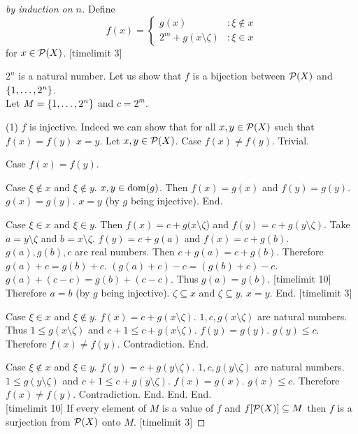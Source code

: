 \documentclass{article}
\begin{document}
\begin{forthel}
\begin{proof}[by induction on $n$]
  Define $$f(x) = \begin{cases} 
      g(x)                           & : \xi \notin x \\
      2^{m} + g(x \setminus \zeta)   & : \xi \in x  \end{cases}$$
  for $x \in {\cal P}(X)$. [timelimit 3]

  $2^{n}$ is a natural number.
  Let us show that $f$ is a bijection between ${\cal P}(X)$ and $\{1,\dots,2^{n}\}$.\\

    Let $M=\{1,\dots,2^{n}\}$ and $c = 2^{m}$.

    (1) $f$ is injective.
    Indeed we can show that for all $x,y \in {\cal P}(X)$ such that $f(x) = f(y)$ $x = y$.
      Let  $x,y \in {\cal P}(X)$.
      Case $f(x) \neq f(y)$. Trivial.
      
      Case $f(x) = f(y)$.

        Case $\xi \notin x$ and $\xi \notin y$. $x,y \in \operatorname{dom}(g)$. Then  $f(x) = g(x)$ and $f(y) = g(y)$. $g(x) = g(y)$. 
          $x = y$ (by $g$ being injective). End.
        
        Case $\xi \in x$ and $\xi \in y$. Then $f(x) = c + g(x \setminus \zeta$) and $f(y) = c + g(y \setminus \zeta)$.
          Take $a=y \setminus \zeta$ and $b=x \setminus \zeta$. $f(y) = c + g(a)$ and $f(x) = c + g(b)$.
          $g(a),g(b),c$ are real numbers.
          Then $c + g(a) = c + g(b)$. Therefore $g(a) + c = g(b) + c$. $(g(a) + c) - c = (g(b) + c) - c$.
          $g(a) + (c - c) = g(b) + (c - c)$. Thus $g(a) = g(b)$. 
          [timelimit 10] Therefore $a = b$ (by $g$ being injective).
          $\zeta \subseteq x$ and $\zeta \subseteq y$. $x = y$. End. [timelimit 3]
          
        Case $\xi \in x$ and $\xi \notin y$. $f(x) = c + g(x \setminus \zeta)$. $1,c,g(x \setminus \zeta)$ are natural numbers.
          Thus $1 \leq g(x \setminus \zeta)$ and $c + 1 \leq c + g(x \setminus \zeta)$. 
          $f(y) = g(y)$. $g(y) \leq c$. Therefore $f(x) \neq f(y)$. Contradiction. End.
          
        Case $\xi \notin x$ and $\xi \in y$. $f(y) = c + g(y \setminus \zeta)$. $1,c,g(y \setminus \zeta)$ are natural numbers.
          $1 \leq g(y \setminus \zeta)$ and $c + 1 \leq c + g(y \setminus \zeta)$. 
          $f(x) = g(x)$. $g(x) \leq c$. Therefore $f(x) \neq f(y)$. Contradiction. End.
      End.
    End.\\
    
    [timelimit 10]
    If every element of $M$ is a value of $f$ and $f[{\cal P}(X)] \subseteq M$ then $f$ is a surjection from ${\cal P}(X)$ onto $M$. [timelimit 3]


\end{proof}
\end{forthel}
\end{document}
